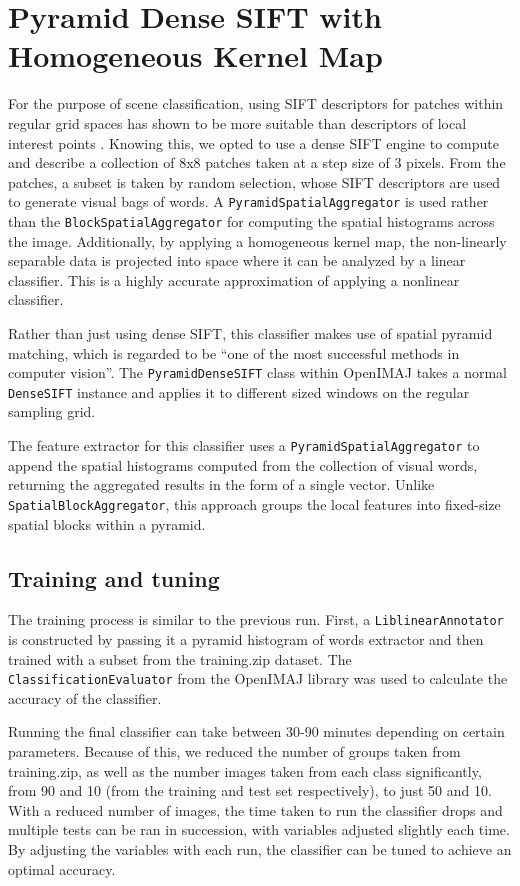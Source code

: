 \documentclass[a4paper]{article}
\begin{document}
\section{Pyramid Dense SIFT with Homogeneous Kernel Map}
For the purpose of scene classification, using SIFT descriptors for patches within regular grid spaces has shown to be more suitable than descriptors of local interest points \cite{lazebnik2006beyond, fei2005bayesian}. Knowing this, we opted to use a dense SIFT engine to compute and describe a collection of 8x8 patches taken at a step size of 3 pixels. From the patches, a subset is taken by random selection, whose SIFT descriptors are used to generate visual bags of words. A \texttt{PyramidSpatialAggregator} is used rather than the \texttt{BlockSpatialAggregator} for computing the spatial histograms across the image. Additionally, by applying a homogeneous kernel map, the non-linearly separable data is projected into space where it can be analyzed by a linear classifier. This is a highly accurate approximation of applying a nonlinear classifier.

Rather than just using dense SIFT, this classifier makes use of spatial pyramid matching, which is regarded to be ``one of the most successful methods in computer vision''\cite{he2014spatial}. The \texttt{PyramidDenseSIFT} class within OpenIMAJ takes a normal \texttt{DenseSIFT} instance and applies it to different sized windows on the regular sampling grid.

The feature extractor for this classifier uses a \texttt{PyramidSpatialAggregator} to append the spatial histograms computed from the collection of visual words, returning the aggregated results in the form of a single vector. Unlike \texttt{SpatialBlockAggregator}, this approach groups the local features into fixed-size spatial blocks within a pyramid.

\subsection{Training and tuning}
The training process is similar to the previous run. First, a \texttt{LiblinearAnnotator} is constructed by passing it a pyramid histogram of words extractor and then trained with a subset from the training.zip dataset. The \texttt{ClassificationEvaluator} from the OpenIMAJ library was used to calculate the accuracy of the classifier.

Running the final classifier can take between 30-90 minutes depending on certain parameters. Because of this, we reduced the number of groups taken from training.zip, as well as the number images taken from each class significantly, from 90 and 10 (from the training and test set respectively), to just 50 and 10. With a reduced number of images, the time taken to run the classifier drops and multiple tests can be ran in succession, with variables adjusted slightly each time. By adjusting the variables with each run, the classifier can be tuned to achieve an optimal accuracy.\\
\end{document}

